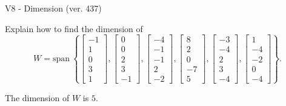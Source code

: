 \begin{exercise}
  \begin{exerciseTitle}V8 - Dimension (ver. 437)\end{exerciseTitle}
  \begin{exerciseStatement}
    Explain how to find the dimension of 
\[W=\mathrm{span}\ \left\{\left[\begin{array}{r}
-1 \\
1 \\
0 \\
3 \\
1
\end{array}\right] , \left[\begin{array}{r}
0 \\
0 \\
2 \\
3 \\
-1
\end{array}\right] , \left[\begin{array}{r}
-4 \\
-1 \\
-1 \\
2 \\
-2
\end{array}\right] , \left[\begin{array}{r}
8 \\
2 \\
0 \\
-7 \\
5
\end{array}\right] , \left[\begin{array}{r}
-3 \\
-4 \\
2 \\
3 \\
-4
\end{array}\right] , \left[\begin{array}{r}
1 \\
-4 \\
-2 \\
0 \\
-4
\end{array}\right]\right\}.\]



  \end{exerciseStatement}
  \begin{exerciseAnswer}
   The dimension of \(W\) is  \(5\).
  


  \end{exerciseAnswer}
\end{exercise}